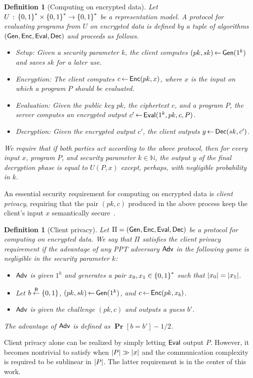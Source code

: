 \documentclass[11pt]{article}
\newtheorem{definition}[theorem]{Definition}
\newcommand{\from}{{\,\leftarrow\,}}
\newcommand{\adv}{{\sf Adv }}
\newcommand{\gen}{{\sf Gen}}
\newcommand{\enc}{{\sf Enc}}
\newcommand{\eval}{{\sf Eval}}
\newcommand{\dec}{{\sf Dec}}
\newcommand{\N}{\mathbb{N}}
\newcommand{\mathify}[1]{\ifmmode{#1}\else\mbox{$#1$}\fi}
\newcommand{\set}[2][]{\mathify{{\left\{#2\right\}}^{#1}}}
\newcommand{\bools}[1][]{\set[#1]{0,1}}
\newcommand{\fnrngdom}[2]{#1\to#2}
\newcommand{\fndef}[3]{{#1\,:\,\fnrngdom{#2}{#3}}}
\newcommand{\size}[1]{\mathify{\left| #1 \right|}}
\newcommand{\prob}[2][]{{\mathop{\mathbf{Pr}}_{#1}\!{\left[{#2}\right]}}}
\newcommand{\samp}[2]{#1\from #2}
\newcommand{\usamp}[2]{#1\stackrel{\footnotesize{\sf R}}{\leftarrow}#2}
\begin{document}
\begin{definition}[Computing on encrypted data]
\label{def-cl-serv} Let
$\fndef{U}{\bools[*]\times\bools[*]}{\bools[*]}$ be a
representation model. A {\em protocol for evaluating programs from
$U$ on encrypted data} is defined by a tuple of algorithms
$(\gen,\enc,\eval,\dec)$ and proceeds as follows.
\begin{itemize}
 \item {\sc Setup:} Given a security parameter $k$,
the client computes $\samp{(pk,sk)}{\gen(1^k)}$ and saves $sk$ for a
later use.
 \item {\sc Encryption:} The client
computes $\samp{c}\enc(pk,x)$, where $x$ is the input on which a
program $P$ should be evaluated.
 \item {\sc Evaluation:} Given the public key
$pk$, the ciphertext $c$, and a program $P$, the server computes an
encrypted output $\samp{c'}{\eval(1^k,pk,c,P)}$.
 \item {\sc Decryption:} Given the
encrypted output $c'$, the client outputs $\samp{y}{\dec(sk,c')}$.
\end{itemize}
We require that if both parties act according to the above protocol,
then for every input $x$, program $P$, and security parameter
$k\in{\N}$, the output $y$ of the final decryption phase is equal to
$U(P,x)$ except, perhaps, with negligible probability in $k$.
\end{definition}

An essential security requirement for computing on encrypted data is
{\em client privacy}, requiring that the pair $(pk,c)$ produced in
the above process keep the client's input $x$ semantically
secure~\cite{GM,Gol04}.
\begin{definition}[Client privacy]
\label{def-clientprivacy} Let $\Pi=(\gen,\enc,\eval,\dec)$ be a
protocol for computing on encrypted data. We say that $\Pi$
satisfies the {\em client privacy} requirement if the advantage of
any PPT adversary $\adv$ in the following game is negligible in the
security parameter $k$:
\begin{itemize}
    \item $\adv$ is given $1^k$ and generates a pair
    $x_0,x_1\in\bools[*]$ such that $\size{x_0}=\size{x_1}$.
    \item Let $\usamp{b}{\bools}$, $\samp{(pk,sk)}{\gen(1^k)}$,
    and $\samp{c}{\enc(pk,x_b)}$.
    \item $\adv$ is given the challenge $(pk,c)$ and outputs a guess $b'$.
\end{itemize}
The advantage of $\adv$ is defined as $\prob{b=b'}-1/2$.
\end{definition}
Client privacy alone can be realized by simply letting $\eval$
output $P$. However, it becomes nontrivial to satisfy when
$\size{P}\gg \size{x}$ and the communication complexity is required
to be sublinear in $\size{P}$. The latter requirement is in the
center of this work.
\end{document}
